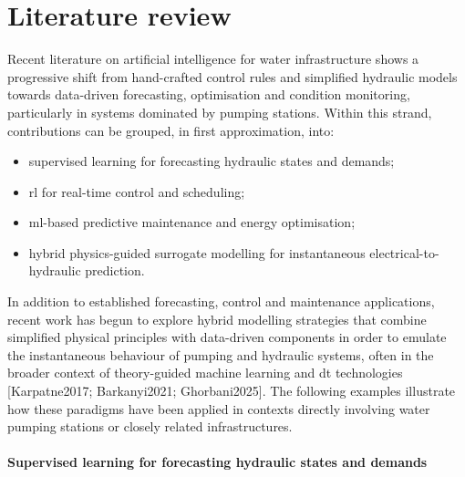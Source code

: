 
\section{Literature review}

Recent literature on artificial intelligence for water infrastructure shows a progressive shift from hand-crafted control rules and simplified hydraulic models towards data-driven forecasting, optimisation and condition monitoring, particularly in systems dominated by pumping stations. Within this strand, contributions can be grouped, in first approximation, into:
\begin{itemize}
    \item[(i)] supervised learning for forecasting hydraulic states and demands;
    \item[(ii)] \acrfull{rl} for real-time control and scheduling;
    \item[(iii)] \acrfull{ml}-based predictive maintenance and energy optimisation;
    \item[(iv)] hybrid physics-guided surrogate modelling for instantaneous electrical-to-hydraulic prediction.
\end{itemize}
In addition to established forecasting, control and maintenance applications, recent work has begun to explore hybrid modelling strategies that combine simplified physical principles with data-driven components in order to emulate the instantaneous behaviour of pumping and hydraulic systems, often in the broader context of theory-guided machine learning and \acrfull{dt} technologies [Karpatne2017; Barkanyi2021; Ghorbani2025]. The following examples illustrate how these paradigms have been applied in contexts directly involving water pumping stations or closely related infrastructures.

\paragraph{Supervised learning for forecasting hydraulic states and demands}

